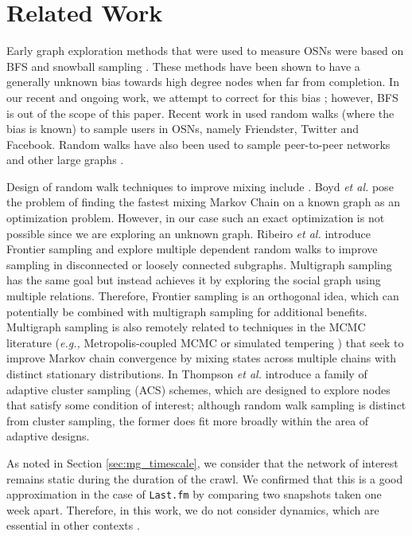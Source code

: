 \documentclass[10pt, conference]{./IEEEtran}
\newcommand{\eg}{{\em e.g., }}
\newcommand{\etal}{\emph{ et al. }}
\newcommand{\lastfm}{{\tt Last.fm}\xspace}
\begin{document}
\section{Related Work} \label{sec:mg_background}

Early graph exploration methods that were used to measure OSNs were based on BFS and snowball sampling \cite{Ahn-WWW-07, Mislove2007, Wilson09}. These methods have been shown to have a generally unknown bias towards high degree nodes when far from completion. In our recent and ongoing work, we attempt to correct for this bias \cite{Kurant2010, Kurant2011_JSAC_BFS}; however, BFS is out of the scope of this paper. Recent work in \cite{Rasti2008, Twitter08, Gjoka2010} used  random walks (where the bias is known) to sample users in OSNs, namely Friendster, Twitter and Facebook. Random walks have also been used to sample peer-to-peer networks \cite{Gkantsidis2004, Rasti09-RDS, Stutzbach2006-unbiased-p2p} and other large graphs \cite{Leskovec2006_sampling_from_large_graphs}.


Design of random walk techniques to improve mixing include \cite{Boyd2004_mixing, Ribeiro2010, GilksRoberts96, Thompson1990}.  Boyd \etal \cite{Boyd2004_mixing} pose the problem of finding the fastest mixing Markov Chain on a known graph as an optimization problem. However, in our case such an exact optimization is not possible since we are exploring an unknown graph. Ribeiro \etal \cite{Ribeiro2010} introduce Frontier sampling and explore multiple dependent random walks to improve sampling in disconnected or loosely connected subgraphs. Multigraph sampling  has the same goal but instead achieves it by exploring the social graph using multiple relations. Therefore, Frontier sampling is an orthogonal idea, which can potentially be combined with multigraph sampling for additional benefits. Multigraph sampling is also remotely related to techniques in the MCMC literature (\eg Metropolis-coupled MCMC or simulated tempering \cite{GilksRoberts96}) that seek to improve Markov chain convergence by mixing states across multiple chains with distinct stationary distributions. In \cite{Thompson1990, Thompson1991a} Thompson \etal introduce a family of adaptive cluster sampling (ACS) schemes, which are designed to explore nodes that satisfy some condition of interest; although random walk sampling is distinct from cluster sampling, the former does fit more broadly within the area of adaptive designs.


%
As noted in Section \ref{sec:mg_timescale}, we consider that the network of interest remains static during the duration of the crawl. We confirmed that this is a good approximation in the case of \lastfm by comparing two snapshots taken one week apart. Therefore, in this work, we do not consider dynamics, which are essential in other contexts \cite{Willinger09-OSN_Research, Rasti2008, acer2010random}.
\end{document}
